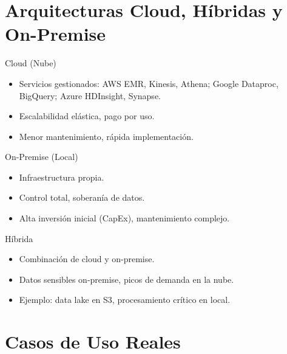 \documentclass[aspectratio=169, 10pt, xcolor=table]{beamer}
\begin{document}
\section{Arquitecturas Cloud, Híbridas y On-Premise}

\begin{frame}{Cloud (Nube)}
    \begin{itemize}
        \item Servicios gestionados: AWS EMR, Kinesis, Athena; Google Dataproc, BigQuery; Azure HDInsight, Synapse.
        \item Escalabilidad elástica, pago por uso.
        \item Menor mantenimiento, rápida implementación.
    \end{itemize}
\end{frame}

\begin{frame}{On-Premise (Local)}
    \begin{itemize}
        \item Infraestructura propia.
        \item Control total, soberanía de datos.
        \item Alta inversión inicial (CapEx), mantenimiento complejo.
    \end{itemize}
\end{frame}

\begin{frame}{Híbrida}
    \begin{itemize}
        \item Combinación de cloud y on-premise.
        \item Datos sensibles on-premise, picos de demanda en la nube.
        \item Ejemplo: data lake en S3, procesamiento crítico en local.
    \end{itemize}
\end{frame}

\section{Casos de Uso Reales}
\end{document}
